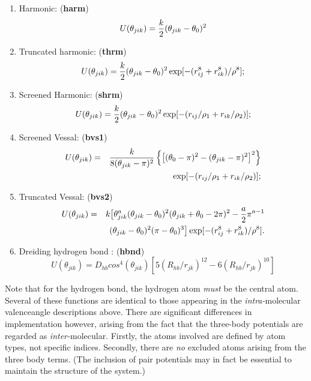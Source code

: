 \begin{enumerate}
\item Harmonic: ({\bf harm})
\begin{equation}
U(\theta_{jik})= {k\over 2} (\theta_{jik} - \theta_0)^2
\end{equation}
\item Truncated harmonic: ({\bf thrm})
\begin{equation}
U(\theta_{jik})= {k\over 2} (\theta_{jik} - \theta_0)^2
\exp[-(r_{ij}^8 + r_{ik}^8)/\rho^8];
\end{equation}
\item Screened Harmonic: ({\bf shrm})
\begin{equation}
 U(\theta_{jik})= {k\over 2} (\theta_{jik} - \theta_0)^2
\exp[-(r_{ij}/\rho_1 + r_{ik}/\rho_2)] ;
\end{equation}
\item Screened Vessal\cite{vessal-94a}: ({\bf bvs1})
\begin{eqnarray}
U(\theta_{jik})&=& {k \over 8(\theta_{jik}-\pi)^2}\left\{ \left[
(\theta_0 -\pi)^2 -(\theta_{jik}-\pi)^2\right]^2
\right\} \nonumber \\
& & \exp[-(r_{ij}/\rho_1 + r_{ik}/\rho_2)];
\end{eqnarray}
\item Truncated Vessal\cite{smith-95a}: ({\bf bvs2})
\begin{eqnarray}
 U(\theta_{jik})&=& k\big[ \theta_{jik}^a (\theta_{jik}-\theta_0)^2
(\theta_{jik}+\theta_0-2\pi)^2  - {a\over 2} \pi^{a-1}\nonumber \\
& & (\theta_{jik}-\theta_0)^2(\pi - \theta_0)^3\big]
\exp[-(r_{ij}^8 + r_{ik}^8)/\rho^8].
\end{eqnarray}
\item Dreiding hydrogen bond \cite{mayo-90a}:
({\bf hbnd})
 \begin{equation}
U(\theta_{jik})=D_{hb}cos^{4}(\theta_{jik})[5(R_{hb}/r_{jk})^{12}-6(R_{hb}/r_{jk})^{10}]
\end{equation}
\end{enumerate}
Note that for the hydrogen bond, the hydrogen atom {\em must} be the
central atom.  Several of these functions are identical to those
appearing in the {\em intra-}molecular valenceangle descriptions
above. There are significant differences in implementation however,
arising from the fact that the three-body potentials are regarded as
{\em inter-}molecular.  Firstly, the atoms involved are defined by
atom types, not specific indices.  Secondly, there are {\em no}
excluded atoms arising from the three body terms. (The inclusion of
pair potentials may in fact be essential to maintain the structure of
the system.)


